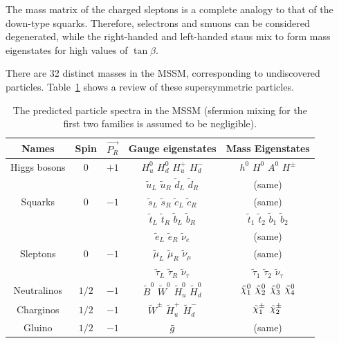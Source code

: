 The mass matrix of the charged sleptons is a complete analogy to that of the down-type squarks.
Therefore, selectrons and smuons can be considered degenerated, while the right-handed and left-handed staus mix to form mass eigenstates for high values of $\tan\beta$.

There are 32 distinct masses in the MSSM, corresponding to undiscovered particles. 
Table~\ref{tab:MSSMUndiscoveredParticles} shows a review of these supersymmetric particles.

\begin{table}[!ht]
\begin{center}
\begin{small}
\setlength{\tabcolsep}{0.0pc}
\begin{tabular*}{\textwidth}{@{\extracolsep{\fill}}ccccc}
\hline
\textbf{Names} & \textbf{Spin} & \textbf{$\vec{P_R}$} & \textbf{Gauge eigenstates}      & \textbf{Mass Eigenstates} \\
\hline
Higgs bosons   & $0$           & $+1$                 & $H_u^0$ $H_d^0$ $H_u^+$ $H_d^-$ & $h^0$ $H^0$ $A^0$ $H^\pm$ \\
\hline
\multirow{3}{*}{Squarks} & \multirow{3}{*}{$0$} & \multirow{3}{*}{$-1$} & $\tilde{u}_L$ $\tilde{u}_R$ $\tilde{d}_L$ $\tilde{d}_R$ & (same) \\
&                      &                       & $\tilde{s}_L$ $\tilde{s}_R$ $\tilde{c}_L$ $\tilde{c}_R$ & (same) \\
&                      &                       & $\tilde{t}_L$ $\tilde{t}_R$ $\tilde{b}_L$ $\tilde{b}_R$ & $\tilde{t}_1$ $\tilde{t}_2$ $\tilde{b}_1$ $\tilde{b}_2$ \\
\hline
\multirow{3}{*}{Sleptons}& \multirow{3}{*}{$0$} & \multirow{3}{*}{$-1$} & $\tilde{e}_L$ $\tilde{e}_R$ $\tilde{\nu}_e$ & (same) \\
&                      &                       & $\tilde{\mu}_L$ $\tilde{\mu}_R$ $\tilde{\nu}_\mu$ & (same) \\
&                      &                       & $\tilde{\tau}_L$ $\tilde{\tau}_R$ $\tilde{\nu}_\tau$& $\tilde{\tau}_1$ $\tilde{\tau}_2$ $\tilde{\nu}_\tau$ \\
\hline
Neutralinos    & $1/2$           & $-1$                 & $\tilde{B}^0$ $\tilde{W}^0$ $\tilde{H}_u^0$ $\tilde{H}_d^0$ & $\ninoone$ $\ninotwo$ $\ninothree$ $\ninofour$ \\
\hline
Charginos      & $1/2$           & $-1$                 & $\tilde{W}^\pm$ $\tilde{H}_u^+$ $\tilde{H}_d^-$ & $\chinoonepm$ $\chinotwopm$ \\
\hline
Gluino         & $1/2$           & $-1$                 & $\tilde{g}$ & (same) \\
\hline
\end{tabular*}
\end{small}
\end{center}
\caption[Predicted MSSM spectra.]{The predicted particle spectra in the MSSM (sfermion mixing for the first two families is assumed to be negligible).}
\label{tab:MSSMUndiscoveredParticles}
\end{table}

